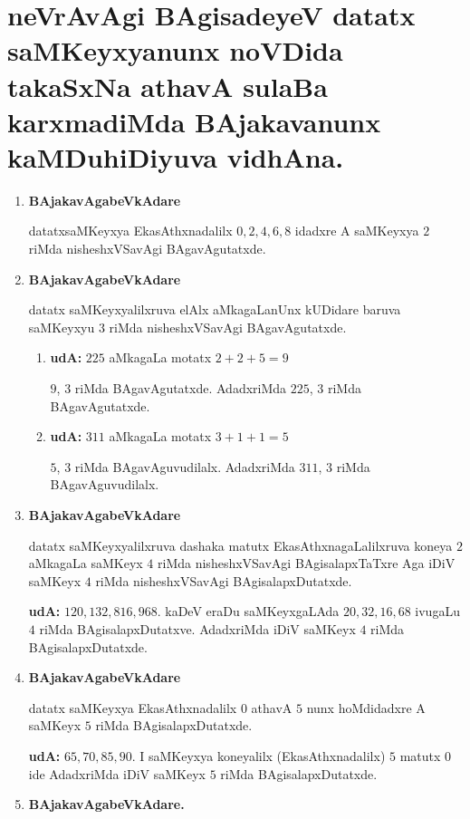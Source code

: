 \chapter{neVrAvAgi BAgisadeyeV datatx saMKeyxyanunx noVDida takaSxNa athavA sulaBa karxmadiMda BAjakavanunx kaMDuhiDiyuva vidhAna.}
\begin{enumerate}[{\rm 1)}]
\item {} \textbf{BAjakavAgabeVkAdare}

datatxsaMKeyxya EkasAthxnadalilx $0,2,4,6,8$ idadxre A saMKeyxya $2$ riMda \-nisheshxVSavAgi BAgavAgutatxde.

\item {} \textbf{BAjakavAgabeVkAdare}

datatx saMKeyxyalilxruva elAlx aMkagaLanUnx kUDidare baruva saMKeyxyu $3$ riMda nisheshxVSavAgi BAgavAgutatxde.
\begin{enumerate}[{\rm 1)}]
\item \textbf{udA:} \quad $225$ aMkagaLa motatx $2+2+5 =9$

$9$, $3$ riMda BAgavAgutatxde. AdadxriMda $225$, $3$ riMda BAgavAgutatxde.

\item \textbf{udA:} \quad $311$ aMkagaLa motatx $3+1+1 =5$

 $5$, $3$ riMda BAgavAguvudilalx. AdadxriMda $311$, $3$ riMda BAgavAguvudilalx.
\end{enumerate}

\vfill\eject
\item {} \textbf{BAjakavAgabeVkAdare}

datatx saMKeyxyalilxruva dashaka matutx EkasAthxnagaLalilxruva koneya $2$ aMkagaLa saMKeyx $4$ riMda nisheshxVSavAgi BAgisalapxTaTxre Aga iDiV saMKeyx $4$ riMda nisheshxVSavAgi BAgi\-salapxDutatxde.

\textbf{udA:} $120,132,816,968$. kaDeV eraDu saMKeyxgaLAda $20,32,16,68$ ivugaLu $4$ riMda BAgisalapxDutatxve. AdadxriMda iDiV saMKeyx $4$ riMda BAgi\-salapxDutatxde.

\item  {} \textbf{BAjakavAgabeVkAdare}

datatx saMKeyxya EkasAthxnadalilx $0$ athavA $5$ nunx hoMdidadxre A saMKeyx $5$ riMda BAgi\-salapxDutatxde.

\textbf{udA:} $65,70,85,90.$  I saMKeyxya koneyalilx (EkasAthxnadalilx) $5$ matutx $0$ ide AdadxriMda iDiV saMKeyx $5$ riMda BAgisalapxDutatxde.
\item {} \textbf{BAjakavAgabeVkAdare.}


\end{enumerate}
